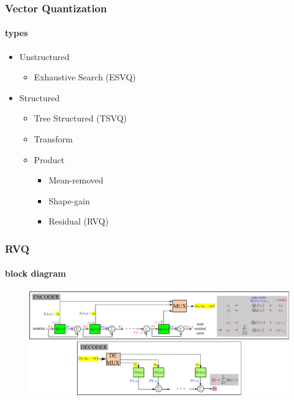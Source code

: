 %
%
%


\begin{frame}
\frametitle{Vector Quantization}
\framesubtitle{types}
\logoCSIPCPL\mypagenum
	\begin{itemize}
		\item Unstructured
			\begin{itemize}
				\item Exhaustive Search (ESVQ)
			\end{itemize}
		\item Structured
		\begin{itemize}
			\item Tree Structured (TSVQ)
			\item Transform
			\item Product
				\begin{itemize}
					\item Mean-removed
					\item Shape-gain
					\item Residual (RVQ)
				\end{itemize}
		\end{itemize}
	\end{itemize}
\end{frame}




\begin{frame}[plain]
\frametitle{RVQ}
\framesubtitle{block diagram}
\logoCSIPCPL\mypagenum
	\begin{changemargin}{-1.3in}{0in}
		\begin{figure}				
			\includegraphics[width=1.3\textwidth]{thesis/RVQ_blockDiagram.pdf}
		\end{figure}
	\end{changemargin}
\end{frame}


